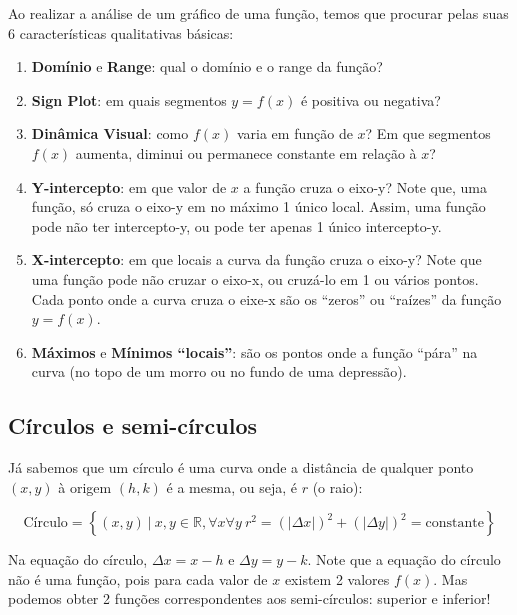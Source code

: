 \documentclass[pdftex, brazil, 12pt, twoside]{article}
\begin{document}
Ao realizar a análise de um gráfico de uma função, temos que procurar pelas suas
6 características qualitativas básicas:

\begin{enumerate}
\item \textbf{Domínio} e \textbf{Range}: qual o domínio e o range da função?
\item \textbf{Sign Plot}: em quais segmentos $y = f(x)$ é positiva ou negativa?
\item \textbf{Dinâmica Visual}: como $f(x)$ varia em função de $x$? Em que segmentos
  $f(x)$ aumenta, diminui ou permanece constante em relação à $x$?
\item \textbf{Y-intercepto}: em que valor de $x$ a função cruza o eixo-y? Note
  que, uma função, só cruza o eixo-y em no máximo 1 único local. Assim, uma função
  pode não ter intercepto-y, ou pode ter apenas 1 único intercepto-y.
\item \textbf{X-intercepto}: em que locais a curva da função cruza o eixo-y? Note
  que uma função pode não cruzar o eixo-x, ou cruzá-lo em 1 ou vários pontos. Cada
  ponto onde a curva cruza o eixe-x são os ``zeros'' ou ``raízes'' da função $y=f(x)$.
\item \textbf{Máximos} e \textbf{Mínimos ``locais''}: são os pontos onde a função ``pára''
  na curva (no topo de um morro ou no fundo de uma depressão).
\end{enumerate}


\subsection{Círculos e semi-círculos}
\label{analise-grafica-circulos}

Já sabemos que um círculo é uma curva onde a distância de qualquer ponto $(x,y)$
à origem $(h,k)$ é a mesma, ou seja, é $r$ (o raio):

\begin{equation}
  \text{Círculo} = \left\{(x,y)\ |\ x,y \in \mathbb{R}, \forall x \forall y\ r^2 = (|\Delta x|)^2 + (|\Delta y|)^2 = \text{constante}\right\}
\end{equation}

Na equação do círculo, $\Delta x = x - h$ e $\Delta y = y - k$. Note que a equação do círculo não é uma função, pois
para cada valor de $x$ existem 2 valores $f(x)$. Mas podemos obter 2 funções correspondentes
aos semi-círculos: superior e inferior!
\end{document}
